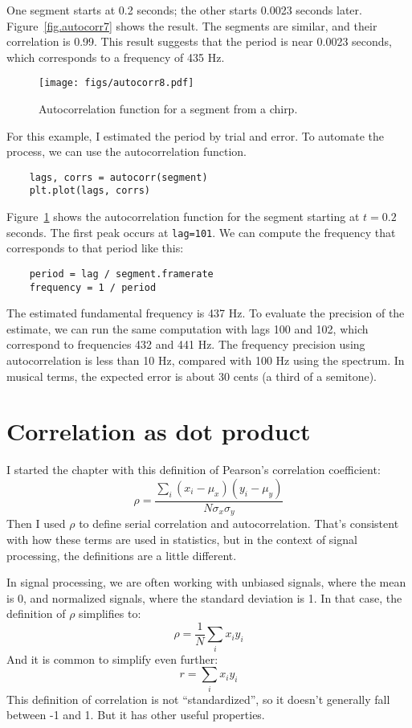 One segment starts at 0.2 seconds; the other starts 0.0023 seconds
later.  Figure~\ref{fig.autocorr7} shows the result.  The segments
are similar, and their correlation is 0.99.  This result suggests
that the period is near 0.0023 seconds, which corresponds to a frequency
of 435 Hz.

\begin{figure}
	\centerline{\texttt{[image: figs/autocorr8.pdf]}}
	\caption{Autocorrelation function for a segment from a chirp.}
	\label{fig.autocorr8}
\end{figure}

For this example, I estimated the period by trial and error.  To automate
the process, we can use the autocorrelation function.

\begin{verbatim}
	lags, corrs = autocorr(segment)
	plt.plot(lags, corrs)
\end{verbatim}

Figure~\ref{fig.autocorr8} shows the autocorrelation function for
the segment starting at $t=0.2$ seconds.  The first peak occurs at
{\tt lag=101}.  We can compute the frequency that corresponds
to that period like this:

\begin{verbatim}
	period = lag / segment.framerate
	frequency = 1 / period
\end{verbatim}

The estimated fundamental frequency is 437 Hz.  To evaluate the
precision of the estimate, we can run the same computation with
lags 100 and 102, which correspond to frequencies 432 and 441 Hz.
The frequency precision using autocorrelation is less than 10 Hz,
compared with 100 Hz using the spectrum.  In musical terms, the
expected error is about 30 cents (a third of a semitone).


\section{Correlation as dot product}
\label{dotproduct}

I started the chapter with this definition of Pearson's
correlation coefficient:
%
\[ \rho = \frac{ \sum_i (x_i - \mu_x) (y_i - \mu_y)}{N \sigma_x \sigma_y} \]
%
Then I used $\rho$ to define serial correlation and autocorrelation.
That's consistent with how these terms are used in statistics,
but in the context of signal processing, the definitions are
a little different.

In signal processing, we are often working with unbiased signals,
where the mean is 0, and normalized signals, where the standard
deviation is 1.  In that case, the definition of $\rho$ simplifies to:
%
\[ \rho = \frac{1}{N} \sum_i x_i y_i \]
%
And it is common to simplify even further:
%
\[ r = \sum_i x_i y_i \]
%
This definition of correlation is not ``standardized'', so it doesn't
generally fall between -1 and 1.  But it has other useful properties.

